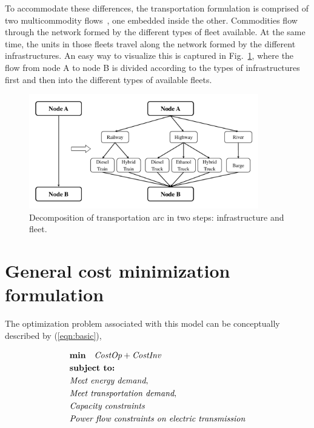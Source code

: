 \documentclass{article}
\begin{document}
To accommodate these differences, the transportation formulation is comprised of two multicommodity flows~\cite{linear_programming}, one embedded inside the other. Commodities flow through the network formed by the different types of fleet available. At the same time, the units in those fleets travel along the network formed by the different infrastructures. An easy way to visualize this is captured in Fig.~\ref{fig:decomposition}, where the flow from node A to node B is divided according to the types of infrastructures first and then into the different types of available fleets.

\begin{figure}[ht]
\begin{center}
\includegraphics[width=100mm]{figs/transportation}
\end{center}
\caption{Decomposition of transportation arc in two steps: infrastructure and fleet.}
\label{fig:decomposition}
\end{figure}


\section{General cost minimization formulation}
The optimization problem associated with this model can be conceptually described by (\ref{eqn:basic}),

\begin{align}
\begin{split}
& \textbf{min}\quad \emph{CostOp}+\emph{CostInv}\\
& \textbf{subject to:}\\
& \emph{Meet energy demand},\\
& \emph{Meet transportation demand},\\
& \emph{Capacity constraints}\\
& \emph{Power flow constraints on electric transmission}\\
\end{split}\label{eqn:basic}
\end{align}
\end{document}
